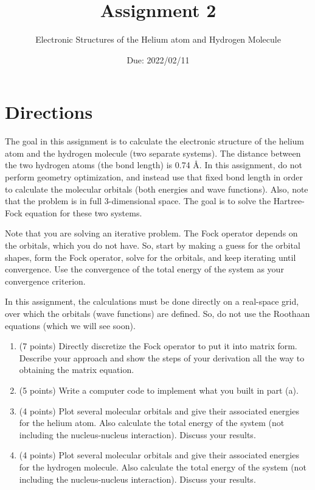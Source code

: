 \documentclass[10pt, oneside, letterpaper]{article}
\title{Assignment 2}
\author{Electronic Structures of the Helium atom and Hydrogen Molecule}
\date{Due: 2022/02/11}
\newcommand{\angstrom}{\textup{\AA}} %
\begin{document}
\maketitle
\thispagestyle{fancy}

\section{Directions}

The goal in this assignment is to calculate the electronic structure of the helium atom and the hydrogen molecule (two separate systems). The distance between the two hydrogen atoms (the bond length) is 0.74 \angstrom. In this assignment, do not perform geometry optimization, and instead use that fixed bond length in order to calculate the molecular orbitals (both energies and wave functions). Also, note that the problem is in full 3-dimensional space. The goal is to solve the Hartree-Fock equation for these two systems.

Note that you are solving an iterative problem. The Fock operator depends on the orbitals, which you do not have. So, start by making a guess for the orbital shapes, form the Fock operator, solve for the orbitals, and keep iterating until convergence. Use the convergence of the total energy of the system as your convergence criterion.

In this assignment, the calculations must be done directly on a real-space grid, over which the orbitals (wave functions) are defined. So, do not use the Roothaan equations (which we will see soon).

\begin{enumerate}[label=(\alph*)]
  \item (7 points) Directly discretize the Fock operator to put it into matrix form. Describe your approach and show the steps of your derivation all the way to obtaining the matrix equation.
  \item (5 points) Write a computer code to implement what you built in part (a).
  \item (4 points) Plot several molecular orbitals and give their associated energies for the helium atom. Also calculate the total energy of the system (not including the nucleus-nucleus interaction). Discuss your results.
  \item (4 points) Plot several molecular orbitals and give their associated energies for the hydrogen molecule. Also calculate the total energy of the system (not including the nucleus-nucleus interaction). Discuss your results.
\end{enumerate}
\end{document}
